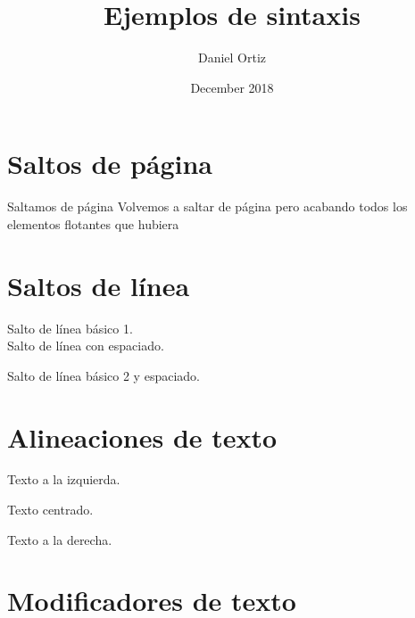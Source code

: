 \documentclass{article}
\title{Ejemplos de sintaxis}
\author{Daniel Ortiz}
\date{December 2018}
\begin{document}
\maketitle
 \newpage
\section{Saltos de página}
Saltamos de página \newpage
Volvemos a saltar de página pero acabando todos los elementos flotantes que hubiera \clearpage
\section{Saltos de línea}
Salto de línea básico 1. \\
Salto de línea con espaciado.\par
Salto de línea básico 2  \quad  y espaciado. \newline
\section{Alineaciones de texto}
\begin{flushleft}
Texto a la izquierda.
\end{flushleft}
\begin{center}
Texto centrado.
\end{center}
\begin{flushright}
Texto a la derecha.
\end{flushright}
\section{Modificadores de texto}
\end{document}
